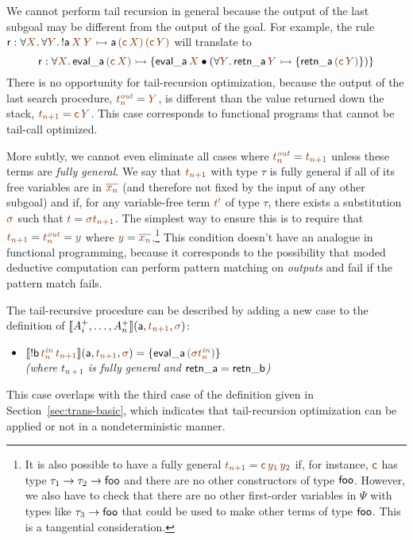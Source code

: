 We cannot perform tail recursion in general because the output of the
last subgoal may be different from the output of the goal. For example,
the rule ${\sf r} : \forall\lf{X}.\,\forall\lf{Y}.\,{!}{\sf a}\,\lf{X}\,\lf{Y} \lefti
{\sf a}\,\lf{({\sf c}\,X)}\,\lf{({\sf c}\,Y)}$ will translate to
\[ {\sf r} : \forall\lf{X}.\,{\sf eval\_a}\,\lf{({\sf c}\,X)} \lefti \{ {\sf
  eval\_a}\,\lf{X} \fuse (\forall \lf{Y}.\, {\sf retn\_a}\,\lf{Y} \lefti \{ {\sf
  retn\_a}\,\lf{({\sf c}\,Y)} \} ) \} \] There is no opportunity for
tail-recursion optimization, because the output of the last search
procedure, $\lf{t^{\it out}_n} = \lf{Y}$, is different than the value returned
down the stack, $\lf{t_{n+1}} = \lf{{\sf c}\,Y}$. This case corresponds to
functional programs that cannot be tail-call optimized.

More subtly, we cannot even eliminate all cases where $\lf{t^{\it out}_n} =
\lf{t_{n+1}}$ unless these terms are {\it fully general}. We say that
$\lf{t_{n+1}}$ with type $\tau$ is fully general if all of its free
variables are in $\lf{\overline{x_n}}$ (and therefore not fixed by the
input of any other subgoal) and if, for any variable-free term $\lf{t'}$ of
type $\tau$, there exists a substitution $\lf{\sigma}$ such that $\lf{t} =
\lf{{\sigma}t_{n+1}}$. The simplest way to ensure this is to require
that $\lf{t_{n+1}} = \lf{t^{\it out}_n} = \lf{y}$ where $\lf{y} =
\lf{\overline{x_n}}$.\footnote{It is also possible to have a fully general
  $\lf{t_{n+1}} = \lf{{\sf c}\,y_1\,y_2}$ if, for instance, $\lf{\sf c}$ 
has type
  $\tau_1 \rightarrow \tau_2 \rightarrow {\sf foo}$ and there are no
  other constructors of type ${\sf foo}$. However, we also have to
  check that there are no other first-order variables in $\Psi$ with
  types like $\tau_3 \rightarrow {\sf foo}$ that could be used to make
  other terms of type ${\sf foo}$. This is
  a tangential consideration.} This condition doesn't have
an analogue in functional programming, because it corresponds to the
possibility that moded deductive computation can perform pattern
matching on {\it outputs} and fail if the pattern match fails.

The tail-recursive procedure can be described by adding a new 
case to the definition of 
$\opbasic{A^+_i,\ldots,A^+_n}{t_{n+1}}{\sigma}$:

\begin{itemize}
\item $\opbasic{{!}{\sf b}\,\lf{t^{\it in}_n}\,\lf{t_{n+1}}}{\lf{t_{n+1}}}{\sigma} 
  = \{{\sf eval\_a}\,\lf{({\sigma}{t^{\it in}_n})}\}$
\\
  {\it (where $t_{n+1}$ is fully general and ${\sf retn\_a} = {\sf retn\_b}$)}
\end{itemize}
This case overlaps with the third case of the definition given
in Section~\ref{sec:trans-basic}, which indicates that tail-recursion
optimization can be applied or not in a nondeterministic manner.

